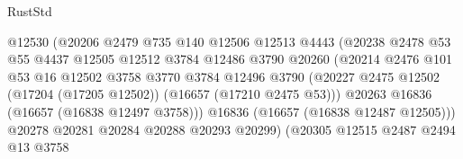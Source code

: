 \begin{lexlean}{RustStd}
\begin{coremodule}
                                      @12530
                                      (@20206
                                        @2479
                                        @735
                                        @140
                                        @12506
                                        @12513
                                        @4443
                                        (@20238
                                          @2478
                                          @53
                                          @55
                                          @4437
                                          @12505
                                          @12512
                                          @3784
                                          @12486
                                          @3790
                                          @20260
                                          (@20214
                                            @2476
                                            @101
                                            @53
                                            @16
                                            @12502
                                            @3758
                                            @3770
                                            @3784
                                            @12496
                                            @3790
                                            (@20227
                                              @2475
                                              @12502
                                              (@17204 (@17205 @12502))
                                              (@16657 (@17210 @2475 @53)))
                                            @20263
                                            @16836
                                            (@16657 (@16838 @12497 @3758)))
                                          @16836
                                          (@16657 (@16838 @12487 @12505)))
                                        @20278
                                        @20281
                                        @20284
                                        @20288
                                        @20293
                                        @20299)
                                      (@20305
                                        @12515
                                        @2487
                                        @2494
                                        @13
                                        @3758

\end{coremodule}
\end{lexlean}
